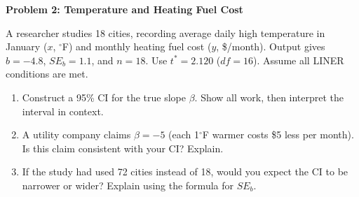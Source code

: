 \documentclass[10pt]{article}
\begin{document}
\vspace{0.2in}

\textbf{Problem 2: Temperature and Heating Fuel Cost}

\vspace{0.05in}
A researcher studies 18 cities, recording average daily high temperature in January
($x$, ${}^\circ$F) and monthly heating fuel cost ($y$, \$/month).
Output gives $b = -4.8$, $SE_b = 1.1$, and $n = 18$.
Use $t^* = 2.120$ ($df = 16$). Assume all LINER conditions are met.

\vspace{0.1in}
\begin{enumerate}[label=\alph*.]

    \item Construct a 95\% CI for the true slope $\beta$. Show all work, then interpret
          the interval in context.

    \item A utility company claims $\beta = -5$ (each 1${}^\circ$F warmer costs \$5 less
          per month). Is this claim consistent with your CI? Explain.

    \item If the study had used 72 cities instead of 18, would you expect the CI to be
          narrower or wider? Explain using the formula for $SE_b$.

\end{enumerate}
\end{document}

